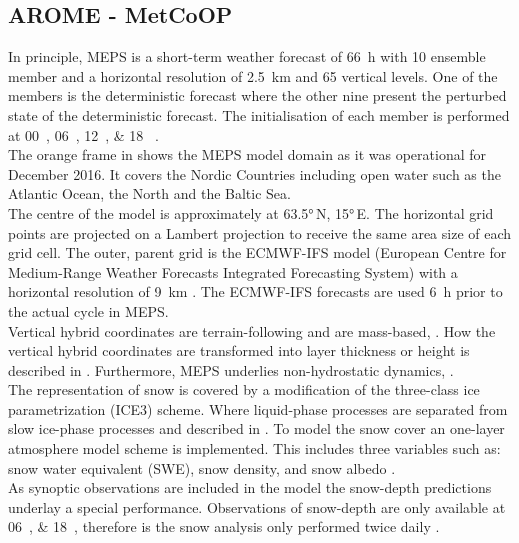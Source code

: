\subsection{AROME - MetCoOP}
In principle, MEPS is a short-term weather forecast of \SI{66}{\hour} with 10 ensemble member and a horizontal resolution of \SI{2.5}{\km} and 65 vertical levels. One of the members is the deterministic forecast where the other nine present the perturbed state of the deterministic forecast. The initialisation of each member is performed at \SIlist{00;06;12;18}{\UTC} \citep{metcoop_wiki_description_2017}.
\\
The orange frame in  shows the MEPS model domain as it was operational for December 2016. It covers the Nordic Countries including open water such as the Atlantic Ocean, the North and the Baltic Sea.  
\\
The centre of the model is approximately at \ang{63.5}\,N, \ang{15}\,E. 
The horizontal grid points are projected on a Lambert projection to receive the same area size of each grid cell. 
The outer, parent grid is the ECMWF-IFS model (European Centre for Medium-Range Weather Forecasts Integrated Forecasting System) with a horizontal resolution of \SI{9}{\km} \citep{homleid_verification_2016}. The ECMWF-IFS forecasts are used \SI{6}{\hour} prior to the actual cycle in MEPS.
\\
Vertical hybrid coordinates are terrain-following and are mass-based, \citep{muller_arome-metcoop:_2017}. How the vertical hybrid coordinates are transformed into layer thickness or height is described in . Furthermore, MEPS underlies non-hydrostatic dynamics, \cite{metcoop_wiki_description_2017}.
\\
The representation of snow is covered by a modification of the three-class ice parametrization (ICE3) scheme. Where liquid-phase processes are separated from slow ice-phase processes and described in . To model the snow cover an one-layer atmosphere model scheme is implemented. This includes three variables such as: snow water equivalent (SWE), snow density, and snow albedo \citep{muller_arome-metcoop:_2017}.
\\
As synoptic observations are included in the model the snow-depth predictions underlay a special performance. Observations of snow-depth are only available at \SIlist{06;18}{\UTC}, therefore is the snow analysis only performed twice daily \citep{muller_arome-metcoop:_2017, homleid_verification_2016}. 
%
